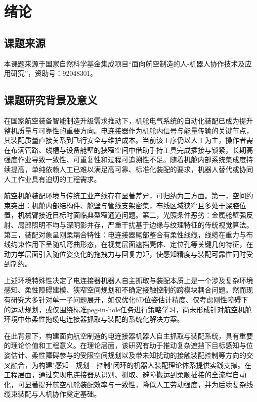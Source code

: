 \chapter{绪论}

\section{课题来源}
本课题来源于国家自然科学基金集成项目“面向航空制造的人-机器人协作技术及应用研究”，资助号：92048301。

\section{课题研究背景及意义}

在国家航空装备智能制造升级需求推动下，机舱电气系统的自动化装配已成为提升整机质量与可靠性的重要方向。电连接器作为机舱内信号与能量传输的关键节点，其装配质量直接关系到飞行安全与维护成本。当前该工序仍以人工为主，操作者需在布满管路、线槽与设备舱壁的狭窄空间中借助手持工具完成插接与锁紧，长期高强度作业导致一致性、可重复性和过程可追溯性不足。随着机舱内部系统集成度持续提高，单纯依赖人工已难以满足高可靠、标准化装配的要求，机器人替代或协同人工作业具有迫切的工程需求。

航空机舱装配环境与传统工业产线存在显著差异，可归纳为三方面。第一，空间约束突出：机舱内部结构件、舱壁与管线支架密集，布线区域狭窄且多处于深腔位置，机械臂接近目标时面临典型窄通道问题。第二，光照条件恶劣：金属舱壁强反射、局部照明不均与深阴影并存，严重干扰基于边缘与纹理特征的传统视觉算法。第三，装配对象呈刚柔耦合特性：电连接器尾部整合有柔性线缆，线缆在重力与布线约束作用下呈随机弯曲形态，在视觉层面遮挡壳体、定位孔等关键几何特征，在动力学层面引入随位姿变化的拖拽力与回复力矩，使感知精度与装配可靠性同时受到制约。

上述环境特殊性决定了电连接器机器人自主抓取与装配本质上是一个涉及复杂环境感知、柔性障碍建模、狭窄空间规划和不确定接触控制的跨模块耦合问题。然而现有研究大多针对单一子问题展开，如仅优化6D位姿估计精度、仅考虑刚性障碍下的运动规划，或仅围绕标准peg-in-hole任务进行策略学习，尚未形成针对航空机舱环境中带柔性拖缆电连接器抓取与装配的系统化解决方案。

在此背景下，构建面向航空制造的电连接器机器人自主抓取与装配系统，具有重要的理论价值和工程意义。在理论层面，该研究有助于推动复杂遮挡下目标感知与位姿估计、柔性障碍参与的受限空间规划以及带未知扰动的接触装配控制等方向的交叉融合，为构建"感知—规划—控制"闭环的机器人装配理论体系提供实践支撑。在工程层面，通过实现电连接器从识别、抓取、避障搬运到柔顺插接的全流程自动化，可显著提升航空机舱装配效率与一致性，降低人工劳动强度，并为后续复杂线缆束装配与人机协作奠定基础。
